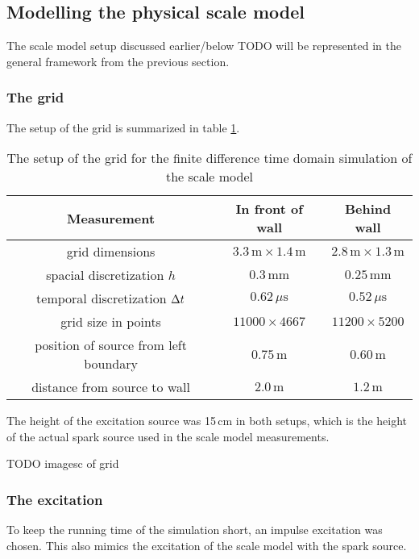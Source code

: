 \subsection{Modelling the physical scale model}
The scale model setup discussed earlier/below TODO will be represented in the general framework from the previous section.

\subsubsection*{The grid}
The setup of the grid is summarized in table \ref{gridSetup}.


\begin{table}[htb]
\begin{center}
\caption{The setup of the grid for the finite difference time domain simulation of the scale model\label{gridSetup}}
\begin{tabular}{c|c|c}
Measurement&	In front of wall&	Behind wall\\\hline
grid dimensions&
	$3.3\,\mathrm{m} \times 1.4\,\mathrm{m}$&
	$2.8\,\mathrm{m} \times 1.3\,\mathrm{m}$\\
spacial discretization $h$&
	$0.3\,\mathrm{mm}$&
	$0.25\,\mathrm{mm}$\\
temporal discretization $\Delta t$&
	$0.62\,\mu\mathrm{s}$&
	$0.52\,\mu\mathrm{s}$\\
grid size in points&
	$11000 \times 4667$&
	$11200 \times 5200$\\
position of source from left boundary&
	$0.75\,\mathrm{m}$&
	$0.60\,\mathrm{m}$\\
distance from source to wall&
	$2.0\,\mathrm{m}$&
	$1.2\,\mathrm{m}$\\
\end{tabular}
\end{center}
\end{table}

The height of the excitation source was 15\,cm in both setups, which is the height of the actual spark source used in the scale model measurements.

TODO imagesc of grid

\subsubsection*{The excitation}
To keep the running time of the simulation short, an impulse excitation was chosen. This also mimics the excitation of the scale model with the spark source.

